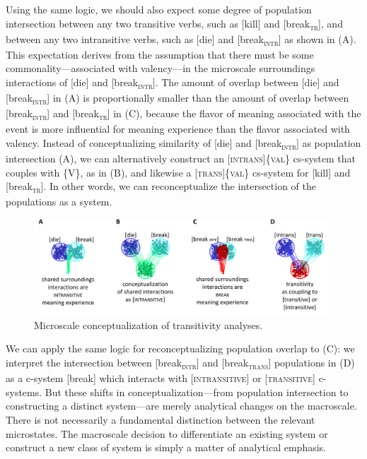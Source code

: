   Using the same logic, we should also expect some degree of population intersection between any two transitive verbs, such as [kill] and [break\textsc{\textsubscript{tr}}], and between any two intransitive verbs, such as [die] and [break\textsc{\textsubscript{intr}}] as shown in {}(A). This expectation derives from the assumption that there must be some commonality—associated with valency—in the microscale surroundings interactions of [die] and [break\textsc{\textsubscript{intr}}]. The amount of overlap between [die] and [break\textsc{\textsubscript{intr}}] in (A) is proportionally smaller than the amount of overlap between [break\textsc{\textsubscript{intr}}] and [break\textsc{\textsubscript{tr}}] in (C), because the flavor of meaning associated with the event is more influential for meaning experience than the flavor associated with valency. Instead of conceptualizing similarity of [die] and [break\textsc{\textsubscript{intr}}] as population intersection (A), we can alternatively construct an [\textsc{intrans}]\{\textsc{val}\} cs-system that couples with \{V\}, as in (B), and likewise a [\textsc{trans}]\{\textsc{val}\} cs-system for [kill] and [break\textsc{\textsubscript{tr}}]. In other words, we can reconceptualize the intersection of the populations as a system.

  
\begin{figure}
\includegraphics[width=\textwidth]{figures/Tilsen-img73.png}
\caption{Microscale conceptualization of transitivity analyses.}
\label{fig:4:23}
\end{figure}
 

  We can apply the same logic for reconceptualizing population overlap to (C): we interpret the intersection between [break\textsubscript{\textsc{intr}}] and [break\textsubscript{\textsc{trans}}] populations in (D) as a c-system [break] which interacts with [\textsc{intransitive}] or [\textsc{transitive}] c-systems. But these shifts in conceptualization—from population intersection to constructing a distinct system—are merely analytical changes on the macroscale. There is not necessarily a fundamental distinction between the relevant microstates. The macroscale decision to differentiate an existing system or construct a new class of system is simply a matter of analytical emphasis.

